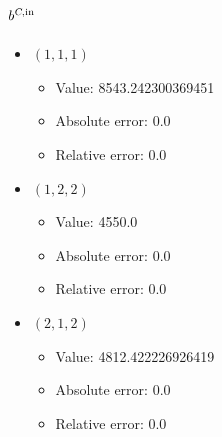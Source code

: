 \documentclass{article}%
\begin{document}
\subsection{$b^{\textsl{C},\text{in}}$}%
\begin{itemize}%
	\item $(1, 1, 1)$%
	\begin{itemize}%
		\item Value: 8543.242300369451%
		\item Absolute error: 0.0%
		\item Relative error: 0.0%
	\end{itemize}%
	\item $(1, 2, 2)$%
	\begin{itemize}%
		\item Value: 4550.0%
		\item Absolute error: 0.0%
		\item Relative error: 0.0%
	\end{itemize}%
	\item $(2, 1, 2)$%
	\begin{itemize}%
		\item Value: 4812.422226926419%
		\item Absolute error: 0.0%
		\item Relative error: 0.0%
	\end{itemize}%
\end{itemize}%
\end{document}

